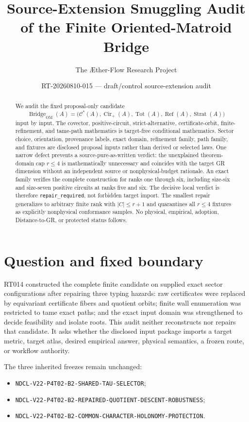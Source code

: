 \documentclass[11pt]{article}
\title{Source-Extension Smuggling Audit of the Finite Oriented-Matroid Bridge}
\author{The \AE ther-Flow Research Project}
\date{RT-20260810-015 --- draft/control source-extension audit}
\newcommand{\Cstar}{\mathcal{C}^{*}}
\newcommand{\Cirp}{\operatorname{Cir}_{+}}
\newcommand{\Bridge}{\operatorname{Bridge}_{\mathrm{OM}}}
\begin{document}
\maketitle

\begin{abstract}
We audit the fixed proposal-only candidate
\[
 \Bridge(A)=\bigl(\Cstar(A),\Cirp(A),\operatorname{Tot}(A),
 \operatorname{Ref}(A),\operatorname{Strat}(A)\bigr)
\]
input by input.  The covector, positive-circuit, strict-alternative,
certificate-orbit, finite-refinement, and tame-path mathematics is target-free
conditional mathematics.  Sector choice, orientation, provenance labels,
exact domain, refinement family, path family, and fixtures are disclosed
proposal inputs rather than derived or selected laws.  One narrow defect
prevents a source-pure-as-written verdict: the unexplained theorem-domain cap
$r\le4$ is mathematically unnecessary and coincides with the target GR
dimension without an independent source or nonphysical-budget rationale.  An
exact family verifies the complete construction for ranks one through six,
including size-six and size-seven positive circuits at ranks five and six.
The decisive local verdict is therefore \texttt{repair\_required}, not forbidden target import.
The smallest repair generalizes to arbitrary finite
rank with $|C|\le r+1$ and quarantines all $r\le4$ fixtures as explicitly
nonphysical conformance samples.  No physical, empirical, adoption,
Distance-to-GR, or protected status follows.
\end{abstract}

\section{Question and fixed boundary}

RT014 constructed the complete finite candidate on supplied exact sector
configurations after repairing three typing hazards: raw certificates were
replaced by equivariant certificate fibers and quotient orbits; finite wall
enumeration was restricted to tame exact paths; and the exact input domain was
strengthened to decide feasibility and isolate roots.  This audit neither
reconstructs nor repairs that candidate.  It asks whether the disclosed input
package imports a target metric, target atlas, desired empirical answer,
physical semantics, a frozen route, or workflow authority.

The three inherited freezes remain unchanged:
\begin{itemize}[leftmargin=*]
  \item \texttt{NDCL-V22-P4T02-B2-SHARED-TAU-SELECTOR};
  \item \texttt{NDCL-V22-P4T02-B2-REPAIRED-QUOTIENT-DESCENT-ROBUSTNESS};
  \item \texttt{NDCL-V22-P4T02-B2-COMMON-CHARACTER-HOLONOMY-PROTECTION}.
\end{itemize}
\end{document}
